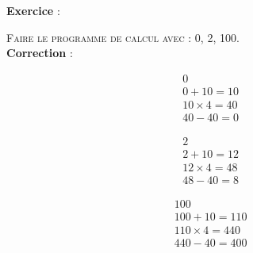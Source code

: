 \documentclass[11pt]{article}
\begin{document}
\textbf{Exercice} : 

\begin{center}\end{center}

\textsc{Faire le programme de calcul avec : 0, 2, 100.} \\

\textbf{Correction} :

\begin{minipage}{0.3\textwidth}

\begin{align*}
& 0 \\
& 0 + 10 = 10 \\
& 10 \times 4 = 40\\
& 40 - 40 = 0
\end{align*}

\end{minipage}\begin{minipage}{0.3\textwidth}

\begin{align*}
& 2 \\
& 2 + 10 = 12 \\
& 12 \times 4 = 48\\
& 48 - 40 = 8
\end{align*}

\end{minipage}\begin{minipage}{0.3\textwidth}

\begin{align*}
& 100 \\
& 100 + 10 = 110 \\
& 110 \times 4 = 440\\
& 440 - 40 = 400
\end{align*}

\end{minipage}

\begin{center}\reversemarginpar\marginnote{$\Box \Box$}
\end{center}
\end{document}

